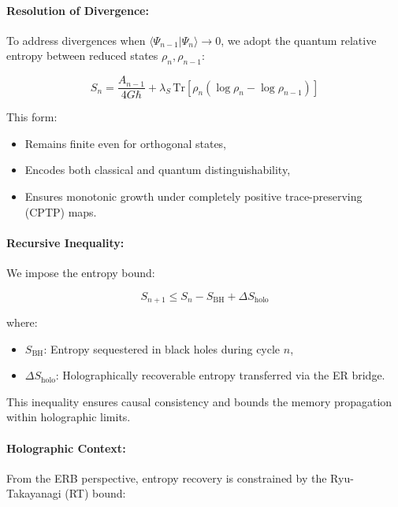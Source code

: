 \paragraph{Resolution of Divergence:}

To address divergences when \( \langle \Psi_{n-1} | \Psi_n \rangle \to 0 \), we adopt the quantum relative entropy between reduced states \( \rho_n, \rho_{n-1} \):

\begin{equation}
S_n = \frac{A_{n-1}}{4G\hbar} + \lambda_S \, \text{Tr}[\rho_n (\log \rho_n - \log \rho_{n-1})]
\end{equation}

This form:
\begin{itemize}
    \item Remains finite even for orthogonal states,
    \item Encodes both classical and quantum distinguishability,
    \item Ensures monotonic growth under completely positive trace-preserving (CPTP) maps.
\end{itemize}

\paragraph{Recursive Inequality:}

We impose the entropy bound:

\begin{equation}
S_{n+1} \leq S_n - S_{\text{BH}} + \Delta S_{\text{holo}}
\end{equation}

where:
\begin{itemize}
    \item \( S_{\text{BH}} \): Entropy sequestered in black holes during cycle \( n \),
    \item \( \Delta S_{\text{holo}} \): Holographically recoverable entropy transferred via the ER bridge.
\end{itemize}

This inequality ensures causal consistency and bounds the memory propagation within holographic limits.

\paragraph{Holographic Context:}

From the ERB perspective, entropy recovery is constrained by the Ryu-Takayanagi (RT) bound:

